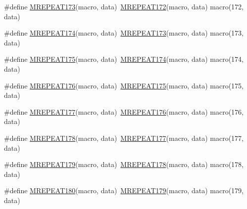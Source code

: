 \begin{DoxyCompactItemize}
\item 
\#define \mbox{\hyperlink{group__group__sam0__utils__mrepeat_ga5882213b7cc6587681221c190929a058}{M\+R\+E\+P\+E\+A\+T173}}(macro,  data)~\mbox{\hyperlink{group__group__sam0__utils__mrepeat_ga6eb1cc1bab798bbc69ffcf54897bb268}{M\+R\+E\+P\+E\+A\+T172}}(macro, data)   macro(172, data)
\item 
\#define \mbox{\hyperlink{group__group__sam0__utils__mrepeat_ga2a61cb0b2664714f05b8b60b1430e182}{M\+R\+E\+P\+E\+A\+T174}}(macro,  data)~\mbox{\hyperlink{group__group__sam0__utils__mrepeat_ga5882213b7cc6587681221c190929a058}{M\+R\+E\+P\+E\+A\+T173}}(macro, data)   macro(173, data)
\item 
\#define \mbox{\hyperlink{group__group__sam0__utils__mrepeat_gaaad2bc103b928f34a3dc0a556f252b02}{M\+R\+E\+P\+E\+A\+T175}}(macro,  data)~\mbox{\hyperlink{group__group__sam0__utils__mrepeat_ga2a61cb0b2664714f05b8b60b1430e182}{M\+R\+E\+P\+E\+A\+T174}}(macro, data)   macro(174, data)
\item 
\#define \mbox{\hyperlink{group__group__sam0__utils__mrepeat_gabc62b219e91e0d7826b32e29b7dd3834}{M\+R\+E\+P\+E\+A\+T176}}(macro,  data)~\mbox{\hyperlink{group__group__sam0__utils__mrepeat_gaaad2bc103b928f34a3dc0a556f252b02}{M\+R\+E\+P\+E\+A\+T175}}(macro, data)   macro(175, data)
\item 
\#define \mbox{\hyperlink{group__group__sam0__utils__mrepeat_ga002048f3987041ffb748ab027b75d2cb}{M\+R\+E\+P\+E\+A\+T177}}(macro,  data)~\mbox{\hyperlink{group__group__sam0__utils__mrepeat_gabc62b219e91e0d7826b32e29b7dd3834}{M\+R\+E\+P\+E\+A\+T176}}(macro, data)   macro(176, data)
\item 
\#define \mbox{\hyperlink{group__group__sam0__utils__mrepeat_gaba5fc88c5803e8272ce412fea9e908a3}{M\+R\+E\+P\+E\+A\+T178}}(macro,  data)~\mbox{\hyperlink{group__group__sam0__utils__mrepeat_ga002048f3987041ffb748ab027b75d2cb}{M\+R\+E\+P\+E\+A\+T177}}(macro, data)   macro(177, data)
\item 
\#define \mbox{\hyperlink{group__group__sam0__utils__mrepeat_ga81eff2faaafc0dc30fa1c29f7c6e33f5}{M\+R\+E\+P\+E\+A\+T179}}(macro,  data)~\mbox{\hyperlink{group__group__sam0__utils__mrepeat_gaba5fc88c5803e8272ce412fea9e908a3}{M\+R\+E\+P\+E\+A\+T178}}(macro, data)   macro(178, data)
\item 
\#define \mbox{\hyperlink{group__group__sam0__utils__mrepeat_ga131a0e131d380f253f0748364eb9cc3f}{M\+R\+E\+P\+E\+A\+T180}}(macro,  data)~\mbox{\hyperlink{group__group__sam0__utils__mrepeat_ga81eff2faaafc0dc30fa1c29f7c6e33f5}{M\+R\+E\+P\+E\+A\+T179}}(macro, data)   macro(179, data)

\end{DoxyCompactItemize}
